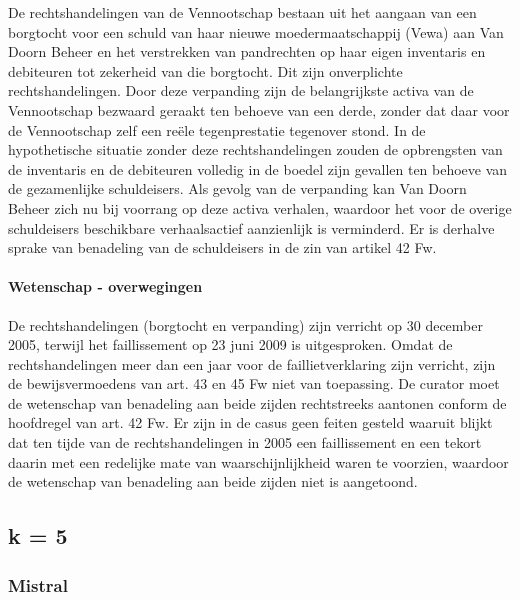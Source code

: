 \documentclass[
  dutch,
  a4paper,
]{article}
\begin{document}
De rechtshandelingen van de Vennootschap bestaan uit het aangaan van een borgtocht voor een schuld van haar nieuwe moedermaatschappij (Vewa) aan Van Doorn Beheer en het verstrekken van pandrechten op haar eigen inventaris en debiteuren tot zekerheid van die borgtocht. Dit zijn onverplichte rechtshandelingen. Door deze verpanding zijn de belangrijkste activa van de Vennootschap bezwaard geraakt ten behoeve van een derde, zonder dat daar voor de Vennootschap zelf een reële tegenprestatie tegenover stond. In de hypothetische situatie zonder deze rechtshandelingen zouden de opbrengsten van de inventaris en de debiteuren volledig in de boedel zijn gevallen ten behoeve van de gezamenlijke schuldeisers. Als gevolg van de verpanding kan Van Doorn Beheer zich nu bij voorrang op deze activa verhalen, waardoor het voor de overige schuldeisers beschikbare verhaalsactief aanzienlijk is verminderd. Er is derhalve sprake van benadeling van de schuldeisers in de zin van artikel 42 Fw.

\paragraph{Wetenschap - overwegingen}\label{wetenschap---overwegingen-2}

De rechtshandelingen (borgtocht en verpanding) zijn verricht op 30 december 2005, terwijl het faillissement op 23 juni 2009 is uitgesproken. Omdat de rechtshandelingen meer dan een jaar voor de faillietverklaring zijn verricht, zijn de bewijsvermoedens van art. 43 en 45 Fw niet van toepassing. De curator moet de wetenschap van benadeling aan beide zijden rechtstreeks aantonen conform de hoofdregel van art. 42 Fw. Er zijn in de casus geen feiten gesteld waaruit blijkt dat ten tijde van de rechtshandelingen in 2005 een faillissement en een tekort daarin met een redelijke mate van waarschijnlijkheid waren te voorzien, waardoor de wetenschap van benadeling aan beide zijden niet is aangetoond.

\newpage


\subsection{k = 5}\label{k-5}

\subsubsection{Mistral}\label{mistral-1}
\end{document}
